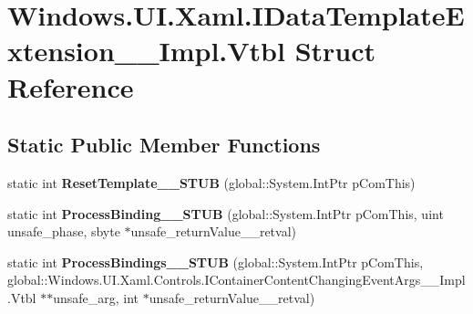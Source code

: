 \hypertarget{struct_windows_1_1_u_i_1_1_xaml_1_1_i_data_template_extension_____impl_1_1_vtbl}{}\section{Windows.\+U\+I.\+Xaml.\+I\+Data\+Template\+Extension\+\_\+\+\_\+\+Impl.\+Vtbl Struct Reference}
\label{struct_windows_1_1_u_i_1_1_xaml_1_1_i_data_template_extension_____impl_1_1_vtbl}
\subsection*{Static Public Member Functions}
\begin{DoxyCompactItemize}
\item 
\mbox{\label{struct_windows_1_1_u_i_1_1_xaml_1_1_i_data_template_extension_____impl_1_1_vtbl_ad92e77d3de13c7464179b9b94119956d}} 
static int {\bfseries Reset\+Template\+\_\+\+\_\+\+S\+T\+UB} (global\+::\+System.\+Int\+Ptr p\+Com\+This)
\item 
\mbox{\label{struct_windows_1_1_u_i_1_1_xaml_1_1_i_data_template_extension_____impl_1_1_vtbl_ab44c2d1b1f5c05d1ca3422a491080f43}} 
static int {\bfseries Process\+Binding\+\_\+\+\_\+\+S\+T\+UB} (global\+::\+System.\+Int\+Ptr p\+Com\+This, uint unsafe\+\_\+phase, sbyte $\ast$unsafe\+\_\+return\+Value\+\_\+\+\_\+retval)
\item 
\mbox{\label{struct_windows_1_1_u_i_1_1_xaml_1_1_i_data_template_extension_____impl_1_1_vtbl_a9fdfed36dbc003abfb54fcb1162d812c}} 
static int {\bfseries Process\+Bindings\+\_\+\+\_\+\+S\+T\+UB} (global\+::\+System.\+Int\+Ptr p\+Com\+This, global\+::\+Windows.\+U\+I.\+Xaml.\+Controls.\+I\+Container\+Content\+Changing\+Event\+Args\+\_\+\+\_\+\+Impl.\+Vtbl $\ast$$\ast$unsafe\+\_\+arg, int $\ast$unsafe\+\_\+return\+Value\+\_\+\+\_\+retval)
\item 
\mbox{\label{struct_windows_1_1_u_i_1_1_xaml_1_1_i_data_template_extension_____impl_1_1_vtbl_ad92e77d3de13c7464179b9b94119956d}} 
$$
\end{DoxyCompactItemize}
